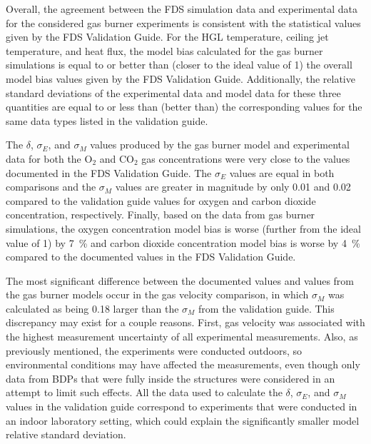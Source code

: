 Overall, the agreement between the FDS simulation data and experimental data for the considered gas burner experiments is consistent with the statistical values given by the FDS Validation Guide. For the HGL temperature, ceiling jet temperature, and heat flux, the model bias calculated for the gas burner simulations is equal to or better than (closer to the ideal value of 1) the overall model bias values given by the FDS Validation Guide. Additionally, the relative standard deviations of the experimental data and model data for these three quantities are equal to or less than (better than) the corresponding values for the same data types listed in the validation guide. 

The $\delta$, $\sigma_E$, and $\sigma_M$ values produced by the gas burner model and experimental data for both the O$_2$ and CO$_2$ gas concentrations were very close to the values documented in the FDS Validation Guide. The $\sigma_E$ values are equal in both comparisons and the $\sigma_M$ values are greater in magnitude by only 0.01 and 0.02 compared to the validation guide values for oxygen and carbon dioxide concentration, respectively. Finally, based on the data from gas burner simulations, the oxygen concentration model bias is worse (further from the ideal value of 1) by 7~\% and carbon dioxide concentration model bias is worse by 4~\% compared to the documented values in the FDS Validation Guide.

The most significant difference between the documented values and values from the gas burner models occur in the gas velocity comparison, in which $\sigma_M$ was calculated as being 0.18 larger than the $\sigma_M$ from the validation guide. This discrepancy may exist for a couple reasons. First, gas velocity was associated with the highest measurement uncertainty of all experimental measurements. Also, as previously mentioned, the experiments were conducted outdoors, so environmental conditions may have affected the measurements, even though only data from BDPs that were fully inside the structures were considered in an attempt to limit such effects. All the data used to calculate the $\delta$, $\sigma_E$, and $\sigma_M$ values in the validation guide correspond to experiments that were conducted in an indoor laboratory setting, which could explain the significantly smaller model relative standard deviation.
